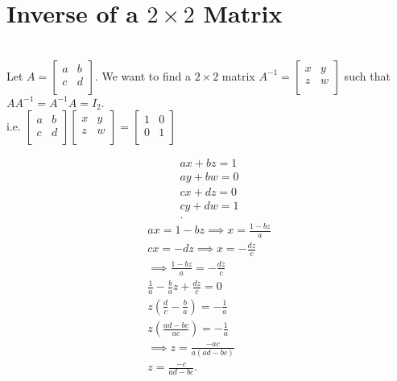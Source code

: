 \documentclass{report}
\begin{document}
\section{Inverse of a $2\times 2$ Matrix}\\
Let $A = \begin{bmatrix}
a & b\\
c & d\\
\end{bmatrix}$. We want to find a $2\times 2$ matrix $A^{-1}= \begin{bmatrix}
x & y\\
z & w\\
\end{bmatrix}$ such that $A A^{-1}= A^{-1}A= I_2$.\\
i.e. $\begin{bmatrix}
a & b\\
c & d\\
\end{bmatrix}\begin{bmatrix}
x & y\\
z & w\\
\end{bmatrix}= \begin{bmatrix}
1 & 0\\
0 & 1\\
\end{bmatrix}$
\raggedcolumns
\begin{multicols}{2}
\begin{align*}
        ax+bz=1\\
        ay+bw=0\\
        cx+dz=0\\
        cy+dw=1\\
.\end{align*}
\break
\begin{align*}
        ax=1-bz \implies x= \frac{1-bz}{a}\\
        cx=-dz \implies x= - \frac{dz}{c}\\
        \implies \frac{1-bz}{a}= - \frac{dz}{c}\\
        \frac{1}{a} - \frac{b}{a}z + \frac{dz}{c}=0\\
        z \left( \frac{d}{c}-\frac{b}{a} \right) = - \frac{1}{a}\\
        z \left( \frac{ad-bc}{ac} \right) =-\frac{1}{a}\\
        \implies z= \frac{-ac}{a \left( ad-bc \right) }\\
        z= \frac{-c}{ad-bc}
.\end{align*}
\end{multicols}\\
\end{document}
